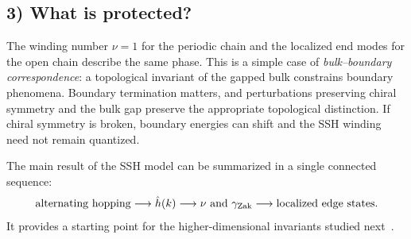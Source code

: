 \subsection*{3) What is protected?}
The winding number $\nu=1$ for the periodic chain and the localized end modes for the open chain describe the same phase. This is a simple case of \emph{bulk--boundary correspondence}: a topological invariant of the gapped bulk constrains boundary phenomena. Boundary termination matters, and perturbations preserving chiral symmetry and the bulk gap preserve the appropriate topological distinction. If chiral symmetry is broken, boundary energies can shift and the SSH winding need not remain quantized.

The main result of the SSH model can be summarized in a single connected sequence:
\begin{equation}
 \text{alternating hopping}\longrightarrow
 \hat{h}(k)\longrightarrow
 \nu\ \text{and}\ \gamma_{\mathrm{Zak}}
 \longrightarrow\text{localized edge states}.
\end{equation}
It provides a starting point for the higher-dimensional invariants studied next~\cite{Asboth2016}.

